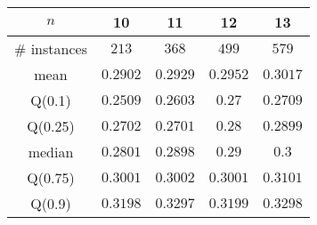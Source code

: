 \begin{tabular}{c|cccc} 
\hline 
$n$ & 10 & 11 & 12 & 13 \tabularnewline 
\hline 
\hline 
\# instances & $213$ & $368$ & $499$ & $579$ \tabularnewline 
mean & $0.2902$ & $0.2929$ & $0.2952$ & $0.3017$ \tabularnewline 
Q(0.1) & $0.2509$ & $0.2603$ & $0.27$ & $0.2709$ \tabularnewline 
Q(0.25) & $0.2702$ & $0.2701$ & $0.28$ & $0.2899$ \tabularnewline 
median & $0.2801$ & $0.2898$ & $0.29$ & $0.3$ \tabularnewline 
Q(0.75) & $0.3001$ & $0.3002$ & $0.3001$ & $0.3101$ \tabularnewline 
Q(0.9) & $0.3198$ & $0.3297$ & $0.3199$ & $0.3298$ \tabularnewline 
\hline 
\end{tabular} 
\medskip{} 

